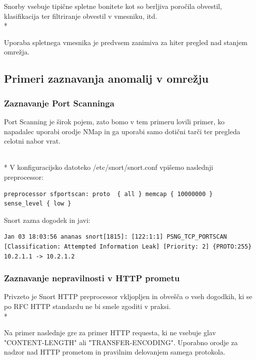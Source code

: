 \documentclass[12pt]{article}
\begin{document}
Snorby vsebuje tipične spletne bonitete kot so berljiva poročila obvestil,
klasifikacija ter filtriranje obvestil v vmesniku, itd.
\\*

Uporaba spletnega vmesnika je predvsem zanimiva za hiter pregled nad stanjem omrežja.

\subsection{Primeri zaznavanja anomalij v omrežju}

\subsubsection{Zaznavanje Port Scanninga} %

Port Scanning je širok pojem, zato bomo v tem primeru lovili primer, ko napadalec uporabi orodje NMap
in ga uporabi samo dotični tarči ter pregleda celotni nabor vrat.

\\*
V konfiguracijsko datoteko /etc/snort/snort.conf vpišemo naslednji preprocessor:

\begin{verbatim}
preprocessor sfportscan: proto  { all } memcap { 10000000 } sense_level { low }
\end{verbatim}

Snort zazna dogodek in javi:

\begin{verbatim}
Jan 03 18:03:56 ananas snort[1815]: [122:1:1] PSNG_TCP_PORTSCAN [Classification: Attempted Information Leak] [Priority: 2] {PROTO:255} 10.2.1.1 -> 10.2.1.2
\end{verbatim}


\subsubsection{Zaznavanje nepravilnosti v HTTP prometu} %

Privzeto je Snort HTTP preprocessor vkljopljen in obvešča o vseh dogodkih, ki se po RFC HTTP standardu ne bi smele zgoditi v praksi.
\\*

Na primer naslednje gre za primer HTTP requesta, ki ne vsebuje glav "CONTENT-LENGTH" ali "TRANSFER-ENCODING". Uporabno orodje za nadzor
nad HTTP prometom in pravilnim delovanjem samega protokola.
\end{document}
